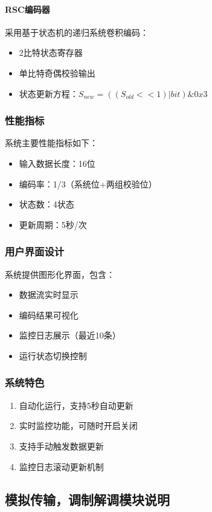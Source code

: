 \documentclass[12pt]{article}
\begin{document}
\paragraph{RSC编码器}
采用基于状态机的递归系统卷积编码：
\begin{itemize}
    \item 2比特状态寄存器
    \item 单比特奇偶校验输出
    \item 状态更新方程：$S_{new} = ((S_{old} << 1) | bit) \& 0x3$
\end{itemize}

\subsubsection{性能指标}
系统主要性能指标如下：
\begin{itemize}
    \item 输入数据长度：16位
    \item 编码率：1/3（系统位+两组校验位）
    \item 状态数：4状态
    \item 更新周期：5秒/次
\end{itemize}

\subsubsection{用户界面设计}
系统提供图形化界面，包含：
\begin{itemize}
    \item 数据流实时显示
    \item 编码结果可视化
    \item 监控日志展示（最近10条）
    \item 运行状态切换控制
\end{itemize}

\subsubsection{系统特色}
\begin{enumerate}
    \item 自动化运行，支持5秒自动更新
    \item 实时监控功能，可随时开启关闭
    \item 支持手动触发数据更新
    \item 监控日志滚动更新机制
\end{enumerate}



\subsection{模拟传输，调制解调模块说明}
\end{document}
